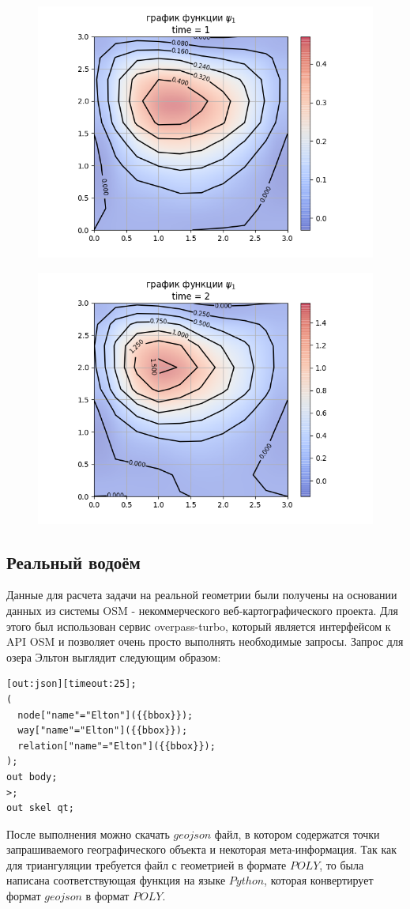 \documentclass[14pt]{extreport}
\begin{document}
\begin{figure}[H]
\centerline{
\includegraphics[width=0.5\linewidth]{images/ex1/psi/1}}
\caption{}
\label{img:ex1:psi:1}
\end{figure}

\begin{figure}[H]
\centerline{
\includegraphics[width=0.5\linewidth]{images/ex1/psi/2}}
\caption{}
\label{img:ex1:psi:2}
\end{figure}


\subsection{Реальный водоём}

Данные для расчета задачи на реальной геометрии были получены на основании данных из системы OSM\cite{bib:website:osm} - некоммерческого веб-картографического проекта. Для этого был использован сервис overpass-turbo\cite{bib:website:overpassturbo}, который является интерфейсом к API OSM и позволяет очень просто выполнять необходимые запросы. Запрос для озера Эльтон выглядит следующим образом:


\begin{lstlisting}
[out:json][timeout:25];
(
  node["name"="Elton"]({{bbox}});
  way["name"="Elton"]({{bbox}});
  relation["name"="Elton"]({{bbox}});
);
out body;
>;
out skel qt;	
\end{lstlisting}

После выполнения можно скачать $geojson$ файл, в котором содержатся точки запрашиваемого географического объекта и некоторая мета-информация. Так как для триангуляции требуется файл с геометрией в формате $POLY$, то была написана соответствующая функция на языке $Python$, которая конвертирует формат $geojson$ в формат $POLY$.
\end{document}
